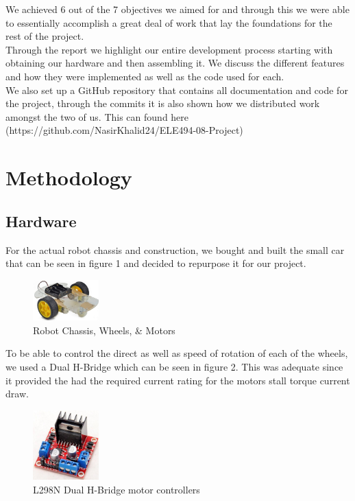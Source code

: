 \documentclass[conference]{IEEEtran}
\begin{document}
    We achieved 6 out of the 7 objectives we aimed for and through this we were able
    to essentially accomplish a great deal of work that lay the foundations for the rest
    of the project.\\

    Through the report we highlight our entire development process starting with obtaining
    our hardware and then assembling it. We discuss the different features and how they 
    were implemented as well as the code used for each.\\

    We also set up a GitHub repository that contains all documentation and code for the project,
    through the commits it is also shown how we distributed work amongst the two of us. This can
    found here (https://github.com/NasirKhalid24/ELE494-08-Project)


    \section{Methodology\\}

    \subsection{Hardware}
    
    For the actual robot chassis and construction, we bought and built the small car
    that can be seen in figure 1 and decided to repurpose it for our project.

    \begin{figure}[H]
        \centering
        \captionsetup{justification=centering}
        \centering
        \includegraphics[width=1in]{1.jpg}
        \caption{Robot Chassis, Wheels, \& Motors}  
        \label{1}
    \end{figure}

    To be able to control the direct as well as speed of rotation of each of the
    wheels, we used a Dual H-Bridge which can be seen in figure 2. This was
    adequate since it provided the had the required current rating for the
    motors stall torque current draw.

    \begin{figure}[H]
        \centering
        \captionsetup{justification=centering}
        \centering
        \includegraphics[width=1in]{2.jpg}
        \caption{L298N Dual H-Bridge motor controllers}  
        \label{2}
    \end{figure}
\end{document}
